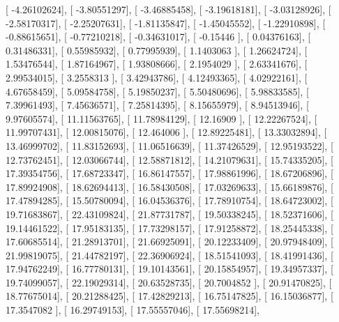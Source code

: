 \documentclass{article}
\begin{document}
       [ -4.26102624],
       [ -3.80551297],
       [ -3.46885458],
       [ -3.19618181],
       [ -3.03128926],
       [ -2.58170317],
       [ -2.25207631],
       [ -1.81135847],
       [ -1.45045552],
       [ -1.22910898],
       [ -0.88615651],
       [ -0.77210218],
       [ -0.34631017],
       [ -0.15446   ],
       [  0.04376163],
       [  0.31486331],
       [  0.55985932],
       [  0.77995939],
       [  1.1403063 ],
       [  1.26624724],
       [  1.53476544],
       [  1.87164967],
       [  1.93808666],
       [  2.1954029 ],
       [  2.63341676],
       [  2.99534015],
       [  3.2558313 ],
       [  3.42943786],
       [  4.12493365],
       [  4.02922161],
       [  4.67658459],
       [  5.09584758],
       [  5.19850237],
       [  5.50480696],
       [  5.98833585],
       [  7.39961493],
       [  7.45636571],
       [  7.25814395],
       [  8.15655979],
       [  8.94513946],
       [  9.97605574],
       [ 11.11563765],
       [ 11.78984129],
       [ 12.16909   ],
       [ 12.22267524],
       [ 11.99707431],
       [ 12.00815076],
       [ 12.464006  ],
       [ 12.89225481],
       [ 13.33032894],
       [ 13.46999702],
       [ 11.83152693],
       [ 11.06516639],
       [ 11.37426529],
       [ 12.95193522],
       [ 12.73762451],
       [ 12.03066744],
       [ 12.58871812],
       [ 14.21079631],
       [ 15.74335205],
       [ 17.39354756],
       [ 17.68723347],
       [ 16.86147557],
       [ 17.98861996],
       [ 18.67206896],
       [ 17.89924908],
       [ 18.62694413],
       [ 16.58430508],
       [ 17.03269633],
       [ 15.66189876],
       [ 17.47894285],
       [ 15.50780094],
       [ 16.04536376],
       [ 17.78910754],
       [ 18.64723002],
       [ 19.71683867],
       [ 22.43109824],
       [ 21.87731787],
       [ 19.50338245],
       [ 18.52371606],
       [ 19.14461522],
       [ 17.95183135],
       [ 17.73298157],
       [ 17.91258872],
       [ 18.25445338],
       [ 17.60685514],
       [ 21.28913701],
       [ 21.66925091],
       [ 20.12233409],
       [ 20.97948409],
       [ 21.99819075],
       [ 21.44782197],
       [ 22.36906924],
       [ 18.51541093],
       [ 18.41991436],
       [ 17.94762249],
       [ 16.77780131],
       [ 19.10143561],
       [ 20.15854957],
       [ 19.34957337],
       [ 19.74099057],
       [ 22.19029314],
       [ 20.63528735],
       [ 20.7004852 ],
       [ 20.91470825],
       [ 18.77675014],
       [ 20.21288425],
       [ 17.42829213],
       [ 16.75147825],
       [ 16.15036877],
       [ 17.3547082 ],
       [ 16.29749153],
       [ 17.55557046],
       [ 17.55698214],
\end{document}
